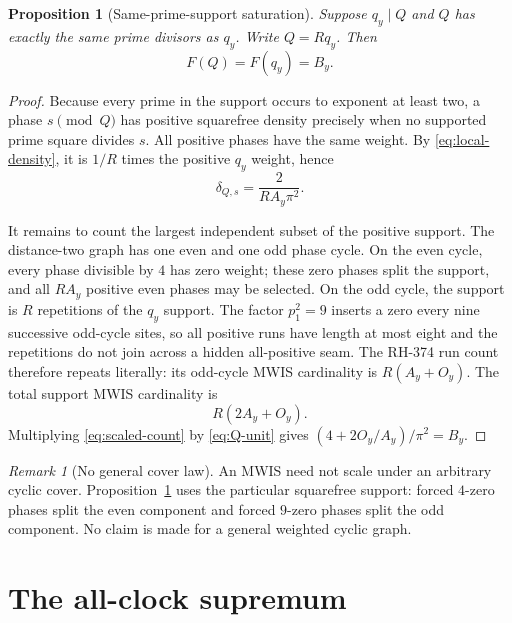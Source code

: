 \documentclass[11pt]{article}
\newtheorem{proposition}[theorem]{Proposition}
\theoremstyle{definition}
\theoremstyle{remark}
\newtheorem{remark}[theorem]{Remark}
\newcommand{\dd}{\delta}
\begin{document}
\begin{proposition}[Same-prime-support saturation]
\label{prop:saturation}
Suppose $q_y\mid Q$ and $Q$ has exactly the same prime divisors as $q_y$.
Write $Q=Rq_y$.  Then
\begin{equation}
                         \boxed{F(Q)=F(q_y)=B_y.}
 \label{eq:saturation}
\end{equation}
\end{proposition}

\begin{proof}
Because every prime in the support occurs to exponent at least two, a phase
$s\pmod Q$ has positive squarefree density precisely when no supported
prime square divides $s$.  All positive phases have the same weight.  By
\eqref{eq:local-density}, it is $1/R$ times the positive $q_y$ weight, hence
\begin{equation}
                         \dd_{Q,s}=\frac{2}{RA_y\pi^2}.
 \label{eq:Q-unit}
\end{equation}

It remains to count the largest independent subset of the positive support.
The distance-two graph has one even and one odd phase cycle.  On the even
cycle, every phase divisible by $4$ has zero weight; these zero phases split
the support, and all $RA_y$ positive even phases may be selected.  On the
odd cycle, the support is $R$ repetitions of the $q_y$ support.  The factor
$p_1^2=9$ inserts a zero every nine successive odd-cycle sites, so all
positive runs have length at most eight and the repetitions do not join
across a hidden all-positive seam.  The RH-374 run count therefore repeats
literally: its odd-cycle MWIS cardinality is $R(A_y+O_y)$.  The total support
MWIS cardinality is
\begin{equation}
                         R(2A_y+O_y).
 \label{eq:scaled-count}
\end{equation}
Multiplying \eqref{eq:scaled-count} by \eqref{eq:Q-unit} gives
$(4+2O_y/A_y)/\pi^2=B_y$.
\end{proof}

\begin{remark}[No general cover law]
An MWIS need not scale under an arbitrary cyclic cover.
Proposition~\ref{prop:saturation}
uses the particular squarefree support: forced $4$-zero phases split the
even component and forced $9$-zero phases split the odd component.  No claim
is made for a general weighted cyclic graph.
\end{remark}

\section{The all-clock supremum}
\label{sec:all-clock}
\end{document}
